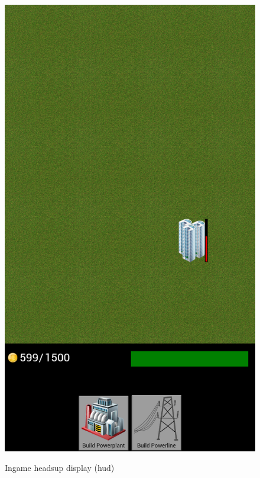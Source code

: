 \begin{figure}[H]
{		\includegraphics[scale=0.17]{pictures/sprint2-screen/sprint2-5}
	}
	\caption{Ingame headsup display (hud)}
	\end{figure}

